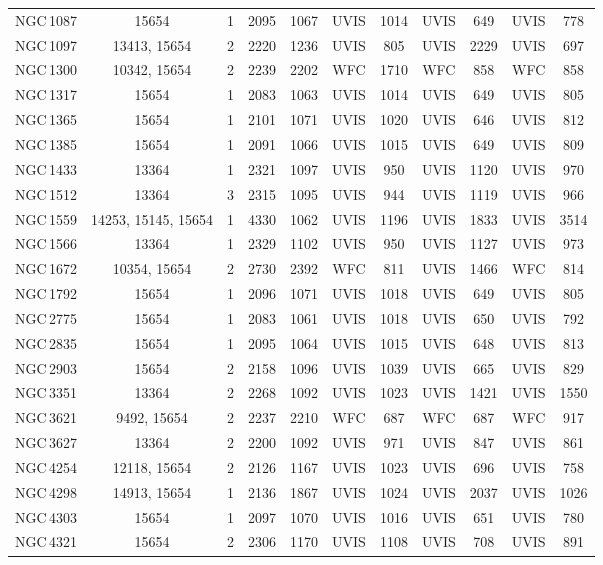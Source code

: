 \begin{table*}
\begin{center}
\begin{tabular}{lcccccccccc}
NGC\,1087 & 15654 & 1 & 2095 & 1067 & UVIS & 1014 & UVIS & 649 & UVIS & 778\\
NGC\,1097 & 13413, 15654 & 2 & 2220 & 1236 & UVIS & 805 & UVIS & 2229 & UVIS & 697\\
NGC\,1300 & 10342, 15654 & 2 & 2239 & 2202 & WFC & 1710 & WFC & 858 & WFC & 858\\
NGC\,1317 & 15654 & 1 & 2083 & 1063 & UVIS & 1014 & UVIS & 649 & UVIS & 805\\
NGC\,1365 & 15654 & 1 & 2101 & 1071 & UVIS & 1020 & UVIS & 646 & UVIS & 812\\
NGC\,1385 & 15654 & 1 & 2091 & 1066 & UVIS & 1015 & UVIS & 649 & UVIS & 809\\
NGC\,1433 & 13364 & 1 & 2321 & 1097 & UVIS & 950 & UVIS & 1120 & UVIS & 970\\
NGC\,1512 & 13364 & 3 & 2315 & 1095 & UVIS & 944 & UVIS & 1119 & UVIS & 966\\
NGC\,1559 & 14253, 15145, 15654 & 1 & 4330 & 1062 & UVIS & 1196 & UVIS & 1833 & UVIS & 3514\\
NGC\,1566 & 13364 & 1 & 2329 & 1102 & UVIS & 950 & UVIS & 1127 & UVIS & 973\\
NGC\,1672 & 10354, 15654 & 2 & 2730 & 2392 & WFC & 811 & UVIS & 1466 & WFC & 814\\
NGC\,1792 & 15654 & 1 & 2096 & 1071 & UVIS & 1018 & UVIS & 649 & UVIS & 805\\
NGC\,2775 & 15654 & 1 & 2083 & 1061 & UVIS & 1018 & UVIS & 650 & UVIS & 792\\
NGC\,2835 & 15654 & 1 & 2095 & 1064 & UVIS & 1015 & UVIS & 648 & UVIS & 813\\
NGC\,2903 & 15654 & 2 & 2158 & 1096 & UVIS & 1039 & UVIS & 665 & UVIS & 829\\
NGC\,3351 & 13364 & 2 & 2268 & 1092 & UVIS & 1023 & UVIS & 1421 & UVIS & 1550\\
NGC\,3621 & 9492, 15654 & 2 & 2237 & 2210 & WFC & 687 & WFC & 687 & WFC & 917\\
NGC\,3627 & 13364 & 2 & 2200 & 1092 & UVIS & 971 & UVIS & 847 & UVIS & 861\\
NGC\,4254 & 12118, 15654 & 2 & 2126 & 1167 & UVIS & 1023 & UVIS & 696 & UVIS & 758\\
NGC\,4298 & 14913, 15654 & 1 & 2136 & 1867 & UVIS & 1024 & UVIS & 2037 & UVIS & 1026\\
NGC\,4303 & 15654 & 1 & 2097 & 1070 & UVIS & 1016 & UVIS & 651 & UVIS & 780\\
NGC\,4321 & 15654 & 2 & 2306 & 1170 & UVIS & 1108 & UVIS & 708 & UVIS & 891\\

\end{tabular}
\end{center}
\end{table*}
